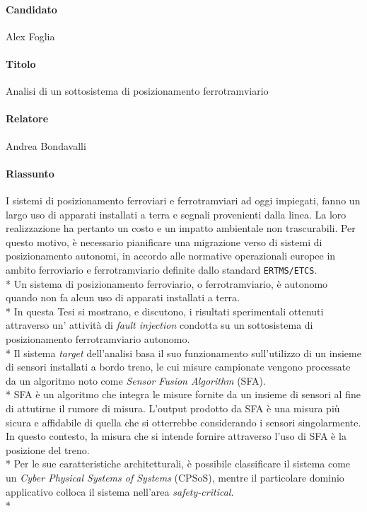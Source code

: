 \documentclass[10pt,a4paper]{article}
\begin{document}
	\paragraph{Candidato}Alex Foglia
	\paragraph{Titolo}Analisi di un sottosistema di posizionamento ferrotramviario
	\paragraph{Relatore}Andrea Bondavalli
	\paragraph{Riassunto}I sistemi di posizionamento ferroviari e ferrotramviari ad oggi impiegati, fanno un largo uso di apparati installati a terra e segnali provenienti dalla linea. La loro realizzazione ha pertanto un costo e un impatto ambientale non trascurabili. Per questo motivo, \`e necessario pianificare una migrazione verso di sistemi di posizionamento autonomi, in accordo alle normative operazionali europee in ambito ferroviario e ferrotramviario definite dallo standard \texttt{ERTMS/ETCS}.\\*
	Un sistema di posizionamento ferroviario, o ferrotramviario, \`e autonomo quando non fa alcun uso di apparati installati a terra.\\*
	In questa Tesi si mostrano, e discutono, i risultati sperimentali ottenuti attraverso un' attivit\`a di \emph{fault injection} condotta su un sottosistema di posizionamento ferrotramviario autonomo.\\*
	Il sistema \emph{target} dell'analisi basa il suo funzionamento sull'utilizzo di un insieme di sensori installati a bordo treno, le cui misure campionate vengono processate da un algoritmo noto come \emph{Sensor Fusion Algorithm} (SFA).\\*
	SFA \`e un algoritmo che integra le misure fornite da un insieme di sensori al fine di attutirne il rumore di misura. L'output prodotto da SFA \`e una misura pi\`u sicura e affidabile di quella che si otterrebbe considerando i sensori singolarmente. In questo contesto, la misura che si intende fornire attraverso l'uso di SFA \`e la posizione del treno.\\*
	Per le sue caratteristiche architetturali, \`e possibile classificare il sistema come un \emph{Cyber Physical Systems of Systems} (CPSoS), mentre il particolare dominio applicativo colloca il sistema nell'area \emph{safety-critical}.\\*
\end{document}
